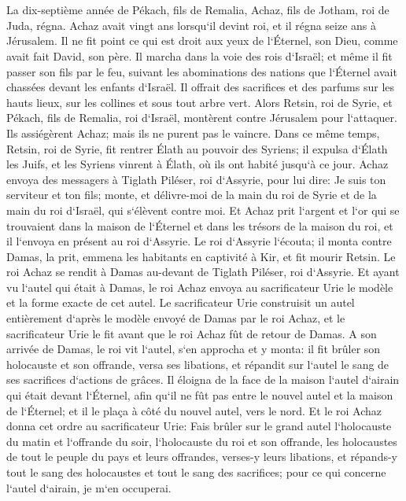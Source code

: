 \chapter{}

\verse La dix-septième année de Pékach, fils de Remalia, Achaz, fils de Jotham, roi de Juda, régna. 
\verse Achaz avait vingt ans lorsqu`il devint roi, et il régna seize ans à Jérusalem. Il ne fit point ce qui est droit aux yeux de l`Éternel, son Dieu, comme avait fait David, son père. 
\verse Il marcha dans la voie des rois d`Israël; et même il fit passer son fils par le feu, suivant les abominations des nations que l`Éternel avait chassées devant les enfants d`Israël. 
\verse Il offrait des sacrifices et des parfums sur les hauts lieux, sur les collines et sous tout arbre vert. 
\verse Alors Retsin, roi de Syrie, et Pékach, fils de Remalia, roi d`Israël, montèrent contre Jérusalem pour l`attaquer. Ils assiégèrent Achaz; mais ils ne purent pas le vaincre. 
\verse Dans ce même temps, Retsin, roi de Syrie, fit rentrer Élath au pouvoir des Syriens; il expulsa d`Élath les Juifs, et les Syriens vinrent à Élath, où ils ont habité jusqu`à ce jour. 
\verse Achaz envoya des messagers à Tiglath Piléser, roi d`Assyrie, pour lui dire: Je suis ton serviteur et ton fils; monte, et délivre-moi de la main du roi de Syrie et de la main du roi d`Israël, qui s`élèvent contre moi. 
\verse Et Achaz prit l`argent et l`or qui se trouvaient dans la maison de l`Éternel et dans les trésors de la maison du roi, et il l`envoya en présent au roi d`Assyrie. 
\verse Le roi d`Assyrie l`écouta; il monta contre Damas, la prit, emmena les habitants en captivité à Kir, et fit mourir Retsin. 
\verse Le roi Achaz se rendit à Damas au-devant de Tiglath Piléser, roi d`Assyrie. Et ayant vu l`autel qui était à Damas, le roi Achaz envoya au sacrificateur Urie le modèle et la forme exacte de cet autel. 
\verse Le sacrificateur Urie construisit un autel entièrement d`après le modèle envoyé de Damas par le roi Achaz, et le sacrificateur Urie le fit avant que le roi Achaz fût de retour de Damas. 
\verse A son arrivée de Damas, le roi vit l`autel, s`en approcha et y monta: 
\verse il fit brûler son holocauste et son offrande, versa ses libations, et répandit sur l`autel le sang de ses sacrifices d`actions de grâces. 
\verse Il éloigna de la face de la maison l`autel d`airain qui était devant l`Éternel, afin qu`il ne fût pas entre le nouvel autel et la maison de l`Éternel; et il le plaça à côté du nouvel autel, vers le nord. 
\verse Et le roi Achaz donna cet ordre au sacrificateur Urie: Fais brûler sur le grand autel l`holocauste du matin et l`offrande du soir, l`holocauste du roi et son offrande, les holocaustes de tout le peuple du pays et leurs offrandes, verses-y leurs libations, et répands-y tout le sang des holocaustes et tout le sang des sacrifices; pour ce qui concerne l`autel d`airain, je m`en occuperai. 
